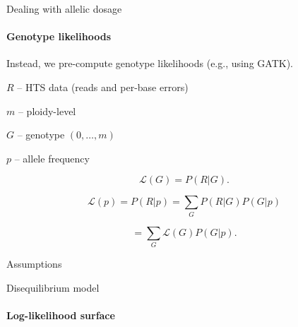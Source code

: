 \documentclass[presentation,sansserif]{beamer}
\begin{document}
\begin{frame}[t]{Dealing with allelic dosage}
	\framesubtitle{Genotype likelihoods}

	Instead, we pre-compute genotype likelihoods (e.g., using GATK).
	\vspace{0.2in}
	\pause
	
	$R$ -- HTS data (reads and per-base errors)
	
	$m$ -- ploidy-level
	
	$G$ -- genotype $(0,\dots,m)$
	
	$p$ -- allele frequency
	

	\pause
	\begin{equation*}
		\mathcal{L}(G) = P(R|G).
	\end{equation*}
	
	\begin{equation*}
		\mathcal{L}(p) = P(R|p) = \sum_G P(R|G)P(G|p)
	\end{equation*}
	\vspace{-0.2in}
	\pause
	
	\begin{equation*}
		= \sum_G \mathcal{L}(G)P(G|p).
	\end{equation*}

\end{frame}

\begin{frame}[t]{Assumptions}

\end{frame}

{ 
\begin{frame}[c,plain]{Disequilibrium model}
	\framesubtitle{Log-likelihood surface}
	\begin{center}
	\end{center}
\end{frame}
}
\end{document}
